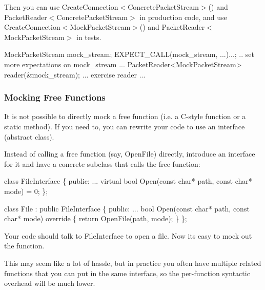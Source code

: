 Then you can use {\ttfamily Create\+Connection$<$Concrete\+Packet\+Stream$>$()} and {\ttfamily Packet\+Reader$<$Concrete\+Packet\+Stream$>$} in production code, and use {\ttfamily Create\+Connection$<$Mock\+Packet\+Stream$>$()} and {\ttfamily Packet\+Reader$<$Mock\+Packet\+Stream$>$} in tests.


\begin{DoxyCode}
MockPacketStream mock\_stream;
EXPECT\_CALL(mock\_stream, ...)...;
.. \textcolor{keyword}{set} more expectations on mock\_stream ...
PacketReader<MockPacketStream> reader(&mock\_stream);
... exercise reader ...
\end{DoxyCode}


\subsubsection*{Mocking Free Functions}

It is not possible to directly mock a free function (i.\+e. a C-\/style function or a static method). If you need to, you can rewrite your code to use an interface (abstract class).

Instead of calling a free function (say, {\ttfamily Open\+File}) directly, introduce an interface for it and have a concrete subclass that calls the free function\+:


\begin{DoxyCode}
\textcolor{keyword}{class }FileInterface \{
 \textcolor{keyword}{public}:
  ...
  \textcolor{keyword}{virtual} \textcolor{keywordtype}{bool} Open(\textcolor{keyword}{const} \textcolor{keywordtype}{char}* path, \textcolor{keyword}{const} \textcolor{keywordtype}{char}* mode) = 0;
\};

\textcolor{keyword}{class }File : \textcolor{keyword}{public} FileInterface \{
 \textcolor{keyword}{public}:
  ...
  \textcolor{keywordtype}{bool} Open(\textcolor{keyword}{const} \textcolor{keywordtype}{char}* path, \textcolor{keyword}{const} \textcolor{keywordtype}{char}* mode)\textcolor{keyword}{ override }\{
     \textcolor{keywordflow}{return} OpenFile(path, mode);
  \}
\};
\end{DoxyCode}


Your code should talk to {\ttfamily File\+Interface} to open a file. Now it\textquotesingle{}s easy to mock out the function.

This may seem like a lot of hassle, but in practice you often have multiple related functions that you can put in the same interface, so the per-\/function syntactic overhead will be much lower.

